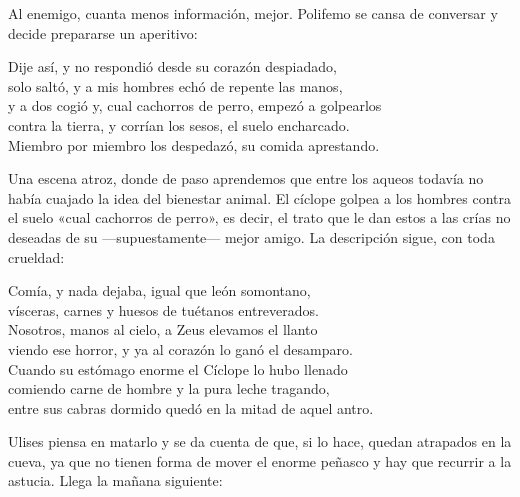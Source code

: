 Al enemigo, cuanta menos información, mejor. Polifemo se cansa de conversar y decide prepararse un aperitivo:

\begin{versocita}
Dije así, y no respondió desde su corazón despiadado,\\
solo saltó, y a mis hombres echó de repente las manos,\\
y a dos cogió y, cual cachorros de perro, empezó a golpearlos\\
contra la tierra, y corrían los sesos, el suelo encharcado.\\
Miembro por miembro los despedazó, su comida aprestando.
\end{versocita}

Una escena atroz, donde de paso aprendemos que entre los aqueos todavía no había cuajado la idea del bienestar animal. El cíclope golpea a los hombres contra el suelo «cual cachorros de perro», es decir, el trato que le dan estos a las crías no deseadas de su ---supuestamente--- mejor amigo. La descripción sigue, con toda crueldad:

\begin{versocita}
Comía, y nada dejaba, igual que león somontano,\\
vísceras, carnes y huesos de tuétanos entreverados.\\
Nosotros, manos al cielo, a Zeus elevamos el llanto\\
viendo ese horror, y ya al corazón lo ganó el desamparo.\\
Cuando su estómago enorme el Cíclope lo hubo llenado\\
comiendo carne de hombre y la pura leche tragando,\\
entre sus cabras dormido quedó en la mitad de aquel antro.
\end{versocita}

Ulises piensa en matarlo y se da cuenta de que, si lo hace, quedan atrapados en la cueva, ya que no tienen forma de mover el enorme peñasco y hay que recurrir a la astucia. Llega la mañana siguiente:

